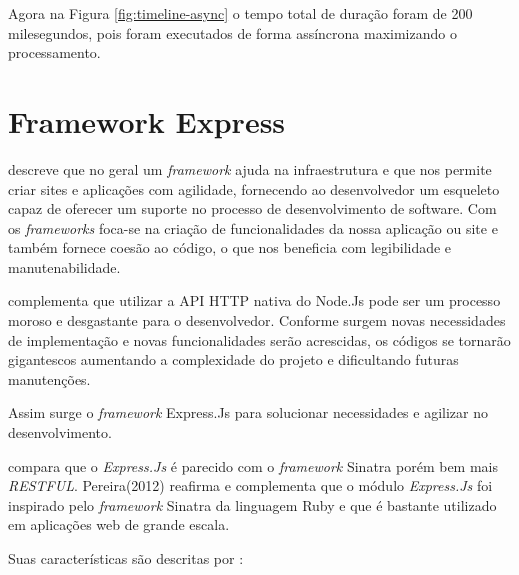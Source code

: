   
  Agora na Figura \ref{fig:timeline-async} o tempo total de duração foram de 200 milesegundos, pois foram executados
  de forma assíncrona maximizando o processamento.

\section{Framework Express}
\label{framework-express}

  \cite{Powers:2012} descreve que no geral um \textit{framework} ajuda na infraestrutura e que nos permite criar sites e aplicações
  com agilidade, fornecendo ao desenvolvedor um esqueleto capaz de oferecer um suporte no processo de desenvolvimento de
  software. Com os \textit{frameworks} foca-se na criação de funcionalidades da nossa aplicação ou site e 
  também fornece coesão ao código, o que nos beneficia com legibilidade e manutenabilidade.

  \cite{Pereira:2013} complementa que utilizar a API HTTP nativa do Node.Js pode ser um processo moroso e desgastante
  para o desenvolvedor. 
  Conforme surgem novas necessidades de implementação e novas funcionalidades serão acrescidas,
  os códigos se tornarão gigantescos aumentando a complexidade do projeto e dificultando futuras manutenções.
  
  Assim surge o \textit{framework} Express.Js para solucionar necessidades e agilizar no desenvolvimento.
  
   compara que o \textit{Express.Js} é parecido com o \textit{framework} Sinatra porém bem mais \textit{RESTFUL}. 
  Pereira(2012) reafirma e complementa que o módulo \textit{Express.Js} foi inspirado pelo \textit{framework} Sinatra da 
  linguagem Ruby e que é bastante utilizado em aplicações web de grande escala.
  
  Suas características são descritas por :
  
